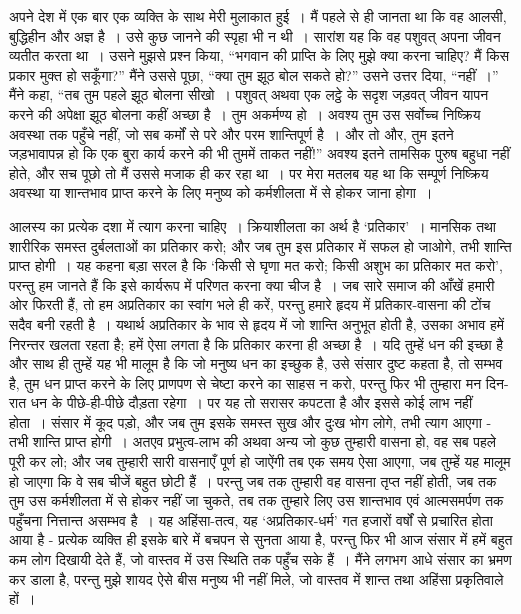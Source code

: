 अपने देश में एक बार एक व्यक्ति के साथ मेरी मुलाकात हुई~। मैं पहले से ही जानता था कि वह आलसी, बुद्धिहीन और अज्ञ है~। उसे कुछ जानने की स्पृहा भी न थी~। सारांश यह कि वह पशुवत् अपना जीवन व्यतीत करता था~। उसने मुझसे प्रश्न किया, “भगवान की प्राप्ति के लिए मुझे क्या करना चाहिए? मैं किस प्रकार मुक्त हो सकूँगा?” मैंने उससे पूछा, “क्या तुम झूठ बोल सकते हो?” उसने उत्तर दिया, “नहीं~।” मैंने कहा, “तब तुम पहले झूठ बोलना सीखो~। पशुवत् अथवा एक लट्ठे के सदृश जड़वत् जीवन यापन करने की अपेक्षा झूठ बोलना कहीं अच्छा है~। तुम अकर्मण्य हो~। अवश्य तुम उस सर्वोच्च निष्क्रिय अवस्था तक पहुँचे नहीं, जो सब कर्मों से परे और परम शान्तिपूर्ण है~। और तो और, तुम इतने जड़भावापन्न हो कि एक बुरा कार्य करने की भी तुममें ताकत नहीं!” अवश्य इतने तामसिक पुरुष बहुधा नहीं होते, और सच पूछो तो मैं उससे मजाक ही कर रहा था~। पर मेरा मतलब यह था कि सम्पूर्ण निष्क्रिय अवस्था या शान्तभाव प्राप्त करने के लिए मनुष्य को कर्मशीलता में से होकर जाना होगा~।

आलस्य का प्रत्येक दशा में त्याग करना चाहिए~। क्रियाशीलता का अर्थ है ‘प्रतिकार’~। मानसिक तथा शारीरिक समस्त दुर्बलताओं का प्रतिकार करो; और जब तुम इस प्रतिकार में सफल हो जाओगे, तभी शान्ति प्राप्त होगी~। यह कहना बड़ा सरल है कि ‘किसी से घृणा मत करो; किसी अशुभ का प्रतिकार मत करो’, परन्तु हम जानते हैं कि इसे कार्यरूप में परिणत करना क्या चीज है~। जब सारे समाज की आँखें हमारी ओर फिरती हैं, तो हम अप्रतिकार का स्वांग भले ही करें, परन्तु हमारे हृदय में प्रतिकार-वासना की टोंच सदैव बनी रहती है~। यथार्थ अप्रतिकार के भाव से हृदय में जो शान्ति अनुभूत होती है, उसका अभाव हमें निरन्तर खलता रहता है; हमें ऐसा लगता है कि प्रतिकार करना ही अच्छा है~। यदि तुम्हें धन की इच्छा है और साथ ही तुम्हें यह भी मालूम है कि जो मनुष्य धन का इच्छुक है, उसे संसार दुष्ट कहता है, तो सम्भव है, तुम धन प्राप्त करने के लिए प्राणपण से चेष्टा करने का साहस न करो, परन्तु फिर भी तुम्हारा मन दिन-रात धन के पीछे-ही-पीछे दौड़ता रहेगा~। पर यह तो सरासर कपटता है और इससे कोई लाभ नहीं होता~। संसार में कूद पड़ो, और जब तुम इसके समस्त सुख और दुःख भोग लोगे, तभी त्याग आएगा - तभी शान्ति प्राप्त होगी~। अतएव प्रभुत्व-लाभ की अथवा अन्य जो कुछ तुम्हारी वासना हो, वह सब पहले पूरी कर लो; और जब तुम्हारी सारी वासनाएँ पूर्ण हो जाऐंगी तब एक समय ऐसा आएगा, जब तुम्हें यह मालूम हो जाएगा कि वे सब चीजें बहुत छोटी हैं~। परन्तु जब तक तुम्हारी वह वासना तृप्त नहीं होती, जब तक तुम उस कर्मशीलता में से होकर नहीं जा चुकते, तब तक तुम्हारे लिए उस शान्तभाव एवं आत्मसमर्पण तक पहुँचना नित्तान्त असम्भव है~। यह अहिंसा-तत्व, यह ‘अप्रतिकार-धर्म’ गत हजारों वर्षों से प्रचारित होता आया है - प्रत्येक व्यक्ति ही इसके बारे में बचपन से सुनता आया है, परन्तु फिर भी आज संसार में हमें बहुत कम लोग दिखायी देते हैं, जो वास्तव में उस स्थिति तक पहुँच सके हैं~। मैंने लगभग आधे संसार का भ्रमण कर डाला है, परन्तु मुझे शायद ऐसे बीस मनुष्य भी नहीं मिले, जो वास्तव में शान्त तथा अहिंसा प्रकृतिवाले हों~।

